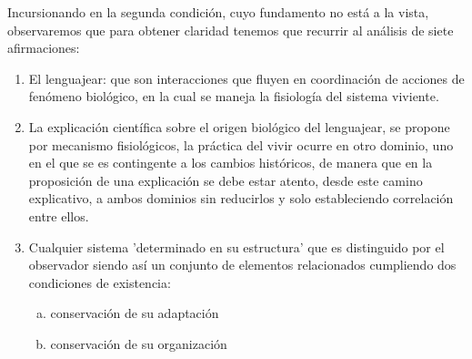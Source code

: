 \documentclass[10pt]{article}
\begin{document}
        
        Incursionando en la segunda condición, cuyo fundamento no está a la vista, observaremos que para obtener claridad tenemos que recurrir al análisis de siete afirmaciones:

        \begin{enumerate}
            \item El lenguajear: que son interacciones que fluyen en coordinación de acciones de fenómeno biológico, en la cual se maneja la fisiología del sistema viviente.
            \item La explicación científica sobre el origen biológico del lenguajear, se propone por mecanismo fisiológicos, la práctica del vivir ocurre en otro dominio, uno en el que se es contingente a los cambios históricos, de manera que en la proposición de una explicación se debe estar atento, desde este camino explicativo, a ambos dominios sin reducirlos y solo estableciendo correlación entre ellos.
            \item Cualquier sistema 'determinado en su estructura' que es distinguido por el observador siendo así un conjunto de elementos relacionados cumpliendo dos condiciones de existencia: 
            \begin{enumerate}[a.]
                \item conservación de su adaptación 
                \item conservación de su organización
                

\end{enumerate}
\end{enumerate}
\end{document}
